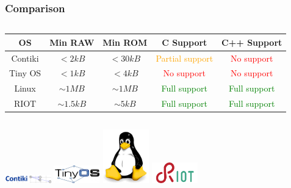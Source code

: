 \documentclass{beamer}
\begin{document}
\begin{frame}
	\frametitle{Comparison}
	\begin{columns}[c]
		\begin{column}{30cm}
			\hspace{0.9cm}
			\begin{tabular}{ | c | c | c | c | c |}
				\hline
				OS & Min RAW & Min ROM & C Support & C++ Support \\ \hline
				Contiki & $< 2kB$ & $< 30kB$ & \textcolor{orange}{Partial support} &
				\textcolor{red}{No support} \\ \hline
				Tiny OS & $< 1kB$ & $< 4kB$ & \textcolor{red}{No support} &
				\textcolor{red}{No support} \\ \hline
				Linux & $\sim 1MB$ & $\sim 1MB$ & \textcolor{green}{Full support} &
				\textcolor{green}{Full support} \\ \hline
				RIOT & $\sim 1.5kB$ & $\sim 5kB$ & \textcolor{green}{Full support} &
				\textcolor{green}{Full support} \\ \hline
			\end{tabular}
		\end{column}
	\end{columns}
	\vspace{.5cm}
	\hspace*{1cm}
	\includegraphics[width=2cm]{figs/contiki-logo.png}
	\hspace*{.5cm}
	\includegraphics[width=2cm]{figs/tinyos-logo.jpg}
	\hspace*{.5cm}
	\includegraphics[width=2cm]{figs/linux-logo.jpeg}
	\hspace*{.5cm}
	\includegraphics[width=2cm]{figs/riot-logo.png}
\end{frame}
\end{document}
